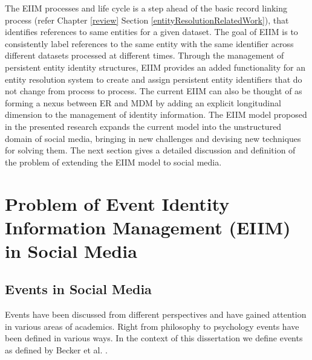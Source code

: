The EIIM processes and life cycle is a step ahead of the basic record linking process (refer Chapter \ref{review} Section \ref{entityResolutionRelatedWork}), that identifies references to same entities for a given dataset. The goal of EIIM is to consistently label references to the same entity with the same identifier across different datasets processed at different times. Through the management of persistent entity identity structures, EIIM provides an added functionality for an entity resolution system to create and assign persistent entity identifiers that do not change from process to process. The current EIIM can also be thought of as forming a nexus between ER and MDM by adding an explicit longitudinal dimension to the management of identity information. The EIIM model proposed in the presented research expands the current model into the unstructured domain of social media, bringing in new challenges and devising new techniques for solving them. The next section gives a detailed discussion and definition of the problem of extending the EIIM model to social media.


\section{Problem of Event Identity Information Management (EIIM) in Social Media\label{problem}}


\subsection{Events in Social Media}



Events have been discussed from different perspectives and have gained attention in various areas of academics. Right from philosophy \cite{zalta2003stanford} to psychology \cite{zacks2001event} events have been defined in various ways. In the context of this dissertation we define events as defined by Becker et al. \cite{becker2011beyond}.

 


